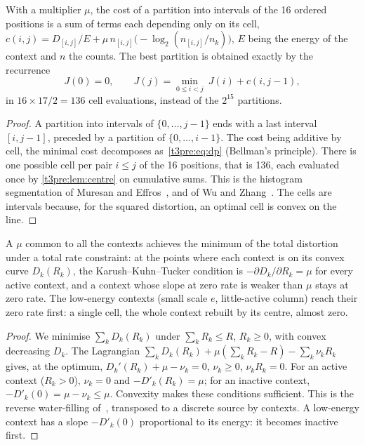 \begin{lemme}\label{t3pre:lem:dp}
With a multiplier $\mu$, the cost of a partition into intervals of the 16 ordered positions is a sum of terms each depending only on its cell, $c(i, j) = D_{[i,j]}/E + \mu\, n_{[i,j]} \bigl(-\log_2 (n_{[i,j]}/n_k)\bigr)$, $E$ being the energy of the context and $n$ the counts. The best partition is obtained exactly by the recurrence
\begin{equation}\label{t3pre:eq:dp}
J(0) = 0, \qquad J(j) = \min_{0 \le i < j}\ J(i) + c(i, j - 1),
\end{equation}
in $16 \times 17 / 2 = 136$ cell evaluations, instead of the $2^{15}$ partitions.
\end{lemme}

\begin{proof}
A partition into intervals of $\{0, \ldots, j-1\}$ ends with a last interval $[i, j-1]$, preceded by a partition of $\{0, \ldots, i-1\}$. The cost being additive by cell, the minimal cost decomposes as~\eqref{t3pre:eq:dp} (Bellman's principle). There is one possible cell per pair $i \le j$ of the 16 positions, that is 136, each evaluated once by \cref{t3pre:lem:centre} on cumulative sums. This is the histogram segmentation of Muresan and Effros~\cite{genome-pe-muresan2002}, and of Wu and Zhang~\cite{genome-pe-wu1993}. The cells are intervals because, for the squared distortion, an optimal cell is convex on the line.
\end{proof}

\begin{proposition}\label{t3pre:prop:remplissage}
A $\mu$ common to all the contexts achieves the minimum of the total distortion under a total rate constraint: at the points where each context is on its convex curve $D_k(R_k)$, the Karush--Kuhn--Tucker condition is $-\partial D_k/\partial R_k = \mu$ for every active context, and a context whose slope at zero rate is weaker than $\mu$ stays at zero rate. The low-energy contexts (small scale $e$, little-active column) reach their zero rate first: a single cell, the whole context rebuilt by its centre, almost zero.
\end{proposition}

\begin{proof}
We minimise $\sum_k D_k(R_k)$ under $\sum_k R_k \le R$, $R_k \ge 0$, with convex decreasing $D_k$. The Lagrangian $\sum_k D_k(R_k) + \mu(\sum_k R_k - R) - \sum_k \nu_k R_k$ gives, at the optimum, $D_k'(R_k) + \mu - \nu_k = 0$, $\nu_k \ge 0$, $\nu_k R_k = 0$. For an active context ($R_k > 0$), $\nu_k = 0$ and $-D'_k(R_k) = \mu$; for an inactive context, $-D'_k(0) = \mu - \nu_k \le \mu$. Convexity makes these conditions sufficient. This is the reverse water-filling of~\cite[th. 10.3.3]{cover2006}, transposed to a discrete source by contexts. A low-energy context has a slope $-D'_k(0)$ proportional to its energy: it becomes inactive first.
\end{proof}

